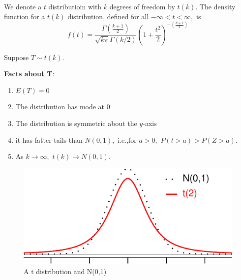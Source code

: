\documentclass[
]{book}
\providecommand{\tightlist}{%
  \setlength{\itemsep}{0pt}\setlength{\parskip}{0pt}}
\theoremstyle{definition}
\theoremstyle{definition}
\theoremstyle{definition}
\theoremstyle{definition}
\theoremstyle{remark}
\begin{document}
We denote a \(t\) distributioin with \(k\) degrees of freedom by \(t(k)\). The density function for a \(t(k)\) distribution, defined for all \(-\infty < t < \infty,\) is
\[f(t) = \frac{\Gamma(\frac{k+1}{2})}{\sqrt{k\pi}\Gamma(k/2)}\left(1+\frac{t^2}{2}\right)^{-\left(\frac{k+1}{2}\right)}\]

Suppose \(T \sim t(k)\).

\textbf{Facts about T}:

\begin{enumerate}
\def\labelenumi{\arabic{enumi}.}
\tightlist
\item
  \(E(T) = 0\)
\item
  The distribution has mode at 0
\item
  The distribution is symmetric about the \(y\)-axis
\item
  it has fatter tails than \(N(0,1),\) i.e.,for \(a > 0,\) \(P(t > a) > P(Z > a)\).
\item
  As \(k \to \infty,\) \(t(k) \to N(0,1)\).
\end{enumerate}

\begin{figure}
\centering
\includegraphics{math340-notes_files/figure-latex/t-vs-st-norm-1.pdf}
\caption{\label{fig:t-vs-st-norm}A t distribution and N(0,1)}
\end{figure}
\end{document}
